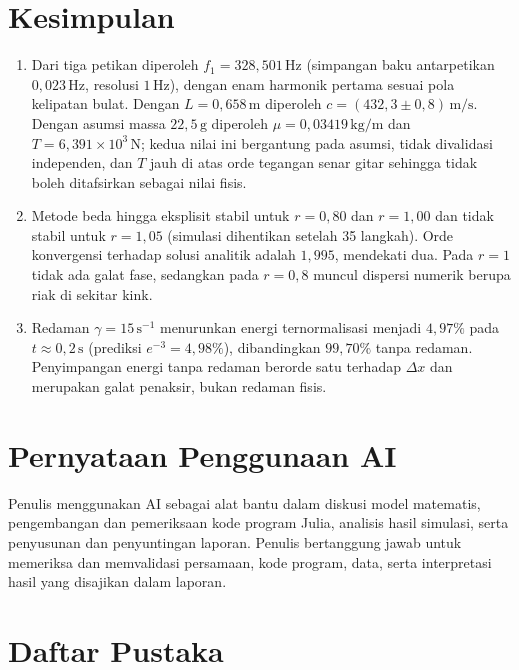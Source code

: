 \documentclass[aps,prl,twocolumn,superscriptaddress]{revtex4-2}
\begin{document}
\section{Kesimpulan}
\label{sec:kesimpulan}

\begin{enumerate}
    \item Dari tiga petikan diperoleh $f_1=328{,}501\,\mathrm{Hz}$ (simpangan baku antarpetikan $0{,}023\,\mathrm{Hz}$, resolusi $1\,\mathrm{Hz}$), dengan enam harmonik pertama sesuai pola kelipatan bulat. Dengan $L=0{,}658\,\mathrm{m}$ diperoleh $c=(432{,}3\pm0{,}8)\,\mathrm{m/s}$. Dengan asumsi massa $22{,}5\,\mathrm{g}$ diperoleh $\mu=0{,}03419\,\mathrm{kg/m}$ dan $T=6{,}391\times10^3\,\mathrm{N}$; kedua nilai ini bergantung pada asumsi, tidak divalidasi independen, dan $T$ jauh di atas orde tegangan senar gitar sehingga tidak boleh ditafsirkan sebagai nilai fisis.

    \item Metode beda hingga eksplisit stabil untuk $r=0{,}80$ dan $r=1{,}00$ dan tidak stabil untuk $r=1{,}05$ (simulasi dihentikan setelah 35 langkah). Orde konvergensi terhadap solusi analitik adalah $1{,}995$, mendekati dua. Pada $r=1$ tidak ada galat fase, sedangkan pada $r=0{,}8$ muncul dispersi numerik berupa riak di sekitar kink.

    \item Redaman $\gamma=15\,\mathrm{s}^{-1}$ menurunkan energi ternormalisasi menjadi $4{,}97\%$ pada $t\approx0{,}2\,\mathrm{s}$ (prediksi $e^{-3}=4{,}98\%$), dibandingkan $99{,}70\%$ tanpa redaman. Penyimpangan energi tanpa redaman berorde satu terhadap $\Delta x$ dan merupakan galat penaksir, bukan redaman fisis.
\end{enumerate}

\section*{Pernyataan Penggunaan AI}

Penulis menggunakan AI sebagai alat bantu dalam diskusi model matematis, pengembangan dan pemeriksaan kode program Julia, analisis hasil simulasi, serta penyusunan dan penyuntingan laporan.
Penulis bertanggung jawab untuk memeriksa dan memvalidasi persamaan, kode program, data, serta interpretasi hasil yang disajikan dalam laporan.

\section*{Daftar Pustaka}
\end{document}
